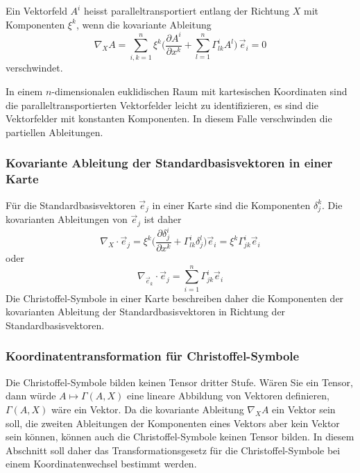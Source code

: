 \begin{definition}
Ein Vektorfeld $A^i$ heisst paralleltransportiert entlang der Richtung
$X$ mit Komponenten $\xi^k$, wenn die kovariante Ableitung
\begin{equation*}
\nabla_X A
=
\sum_{i,k=1}^n
\xi^k
\biggl(
\frac{\partial A^i}{\partial x^k}
+
\sum_{l=1}^n
\Gamma^i_{lk} A^l
\biggr)
\,\vec{e}_i
= 0
\end{equation*}
verschwindet.
\end{definition}

In einem $n$-dimensionalen euklidischen Raum mit kartesischen Koordinaten
sind die paralleltransportierten Vektorfelder leicht zu identifizieren,
es sind die Vektorfelder mit konstanten Komponenten.
In diesem Falle verschwinden die partiellen Ableitungen.



%
%
\subsubsection{Kovariante Ableitung der Standardbasisvektoren in einer Karte}
Für die Standardbasisvektoren $\vec{e}_j$ in einer Karte sind die
Komponenten $\delta_j^k$.
Die kovarianten Ableitungen von $\vec{e}_j$ ist daher
\begin{equation}
\nabla_X\cdot \vec{e}_j
=
\xi^k
\biggl(
\frac{\partial \delta_j^i}{\partial x^k}
+
\Gamma^i_{lk}
\delta_j^l
\biggr)
\vec{e}_i
=
\xi^k\Gamma^i_{jk}\vec{e}_i
\label{buch:zusammenhang:paralleltransport:kovabl:eqn:kontravektor}
\end{equation}
oder
\begin{equation}
\nabla_{\vec{e}_k}\cdot \vec{e}_j
=
\sum_{i=1}^n
\Gamma^i_{jk}\vec{e}_i
\label{buch:zusammenhang:paralleltransport:kovabl:eqn:kontrabasis}
\end{equation}
Die Christoffel-Symbole in einer Karte beschreiben daher die Komponenten
der kovarianten Ableitung der Standardbasisvektoren in Richtung
der Standardbasisvektoren.

%
%
\subsubsection{Koordinatentransformation für Christoffel-Symbole}
Die Christoffel-Symbole bilden keinen Tensor dritter Stufe.
Wären Sie ein Tensor, dann würde $A\mapsto \Gamma(A,X)$ eine lineare
Abbildung von Vektoren definieren, $\Gamma(A,X)$ wäre ein Vektor.
Da die kovariante Ableitung $\nabla_XA$ ein Vektor sein soll,
die zweiten Ableitungen der Komponenten eines Vektors aber kein Vektor
sein können, können auch die Christoffel-Symbole keinen Tensor bilden.
In diesem Abschnitt soll daher das Transformationsgesetz für die
Christoffel-Symbole bei einem Koordinatenwechsel bestimmt werden.

